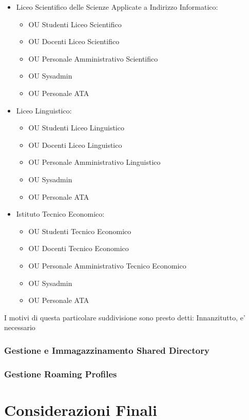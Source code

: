 \documentclass{report}
\begin{document}
            \begin{itemize}
                \item Liceo Scientifico delle Scienze Applicate a Indirizzo Informatico:
                    \begin{itemize}
                        \item OU Studenti Liceo Scientifico
                        \item OU Docenti Liceo Scientifico
                        \item OU Personale Amministrativo Scientifico
                        \item OU Sysadmin
                        \item OU Personale ATA
                    \end{itemize}
                \item Liceo Linguistico:
                    \begin{itemize}
                        \item OU Studenti Liceo Linguistico
                        \item OU Docenti Liceo Linguistico
                        \item OU Personale Amministrativo Linguistico
                        \item OU Sysadmin
                        \item OU Personale ATA
                    \end{itemize}
                \item Istituto Tecnico Economico:
                    \begin{itemize}
                        \item OU Studenti Tecnico Economico
                        \item OU Docenti Tecnico Economico
                        \item OU Personale Amministrativo Tecnico Economico
                        \item OU Sysadmin
                        \item OU Personale ATA
                    \end{itemize}
            \end{itemize}
            I motivi di questa particolare suddivisione sono presto detti: Innanzitutto, e' necessario
            \subsection{Gestione e Immagazzinamento Shared Directory}
            \subsection{Gestione Roaming Profiles}
    \chapter{Considerazioni Finali}
            
\end{document}
